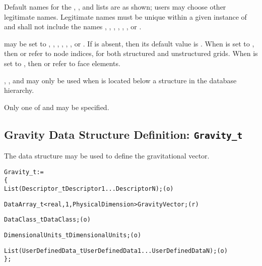 \clearpage
\begin{notes}
\item Default names for the , ,
      and  lists are as shown; users may choose
      other legitimate names.
      Legitimate names must be unique within a given instance of
       and shall not include the names
      , , ,
      , , , or
      .
\item {} may be set to ,
      , , ,
      , , or .
      If  is absent, then its default value is
      .
      When  is set to , then
       or  refer to node indices, for
      both structured and unstructured grids.
      When  is set to , then
       or  refer to face elements.
\item {}, , and 
      may only be used when  is located below a
       structure in the database hierarchy.
\item Only one of  and  may be
      specified.
\end{notes}

\subsection{ Gravity Data Structure Definition: \texttt{Gravity\_t}}
\label{s:Gravity}

The  data structure may be used to define the
gravitational vector.

\begin{alltt}
  Gravity\_t :=
    \{
    List( Descriptor\_t Descriptor1 ... DescriptorN ) ;                      (o)

    DataArray\_t<real, 1, PhysicalDimension> GravityVector ;                 (r)

    DataClass\_t DataClass ;                                                 (o)

    DimensionalUnits\_t DimensionalUnits ;                                   (o)

    List( UserDefinedData\_t UserDefinedData1 ... UserDefinedDataN ) ;       (o)
    \} ;
\end{alltt}

